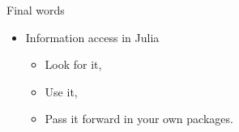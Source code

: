 \documentclass{beamer}
\begin{document}
%
%

\begin{frame}{Final words}
  \begin{itemize}
    \item Information access in Julia
    \begin{itemize}
      \item Look for it,
      \item Use it,
      \item Pass it forward in your own packages.
    \end{itemize}
  \end{itemize}

\end{frame}
\end{document}

